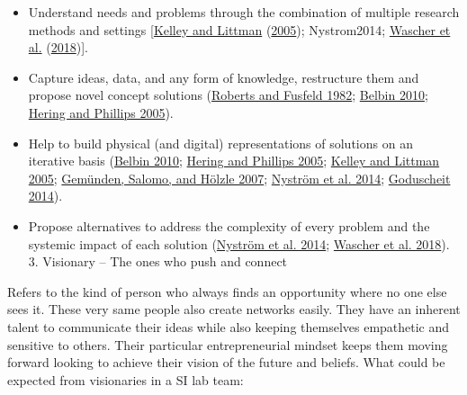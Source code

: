\documentclass[AMA,STIX1COL,APA,STIX2COL]{WileyNJD-v2}
\providecommand{\tightlist}{%
  \setlength{\itemsep}{0pt}\setlength{\parskip}{0pt}}
\begin{document}
\begin{itemize}
\tightlist
\item
  Understand needs and problems through the combination of multiple
  research methods and settings
  {[}\protect\hyperlink{ref-Kelley2005}{Kelley and Littman}
  (\protect\hyperlink{ref-Kelley2005}{2005}); Nystrom2014;
  \protect\hyperlink{ref-Wascher2018}{Wascher et al.}
  (\protect\hyperlink{ref-Wascher2018}{2018}){]}.
\item
  Capture ideas, data, and any form of knowledge, restructure them and
  propose novel concept solutions
  (\protect\hyperlink{ref-Roberts1982}{Roberts and Fusfeld 1982};
  \protect\hyperlink{ref-Belbin2010}{Belbin 2010};
  \protect\hyperlink{ref-Hering2005}{Hering and Phillips 2005}).
\item
  Help to build physical (and digital) representations of solutions on
  an iterative basis (\protect\hyperlink{ref-Belbin2010}{Belbin 2010};
  \protect\hyperlink{ref-Hering2005}{Hering and Phillips 2005};
  \protect\hyperlink{ref-Kelley2005}{Kelley and Littman 2005};
  \protect\hyperlink{ref-Gemunden2007}{Gemünden, Salomo, and Hölzle
  2007}; \protect\hyperlink{ref-Nystrom2014}{Nyström et al. 2014};
  \protect\hyperlink{ref-Goduscheit2014}{Goduscheit 2014}).
\item
  Propose alternatives to address the complexity of every problem and
  the systemic impact of each solution
  (\protect\hyperlink{ref-Nystrom2014}{Nyström et al. 2014};
  \protect\hyperlink{ref-Wascher2018}{Wascher et al. 2018}). 3.
  Visionary -- The ones who push and connect
\end{itemize}

Refers to the kind of person who always finds an opportunity where no
one else sees it. These very same people also create networks easily.
They have an inherent talent to communicate their ideas while also
keeping themselves empathetic and sensitive to others. Their particular
entrepreneurial mindset keeps them moving forward looking to achieve
their vision of the future and beliefs. What could be expected from
visionaries in a SI lab team:
\end{document}
